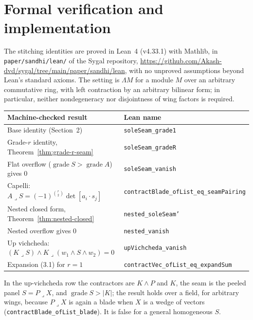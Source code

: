 \documentclass[11pt]{article}
\begin{document}
\section{Formal verification and implementation}
\label{sec:formal}

The stitching identities are proved in Lean~4 (v4.33.1) with Mathlib, in
\texttt{paper/sandhi/lean/} of the Sygal repository,
\url{https://github.com/Akash-dvd/sygal/tree/main/paper/sandhi/lean}, with no unproved
assumptions beyond Lean's standard axioms. The setting is
\(\Lambda M\) for a module \(M\) over an arbitrary commutative ring, with left
contraction by an arbitrary bilinear form; in particular, neither
nondegeneracy nor disjointness of wing factors is required.

\begin{center}
\small
\begin{tabular}{@{}ll@{}}
\toprule
Machine-checked result & Lean name\\
\midrule
Base identity (Section~2) & \texttt{soleSeam\_grade1}\\
Grade-\(r\) identity, Theorem~\ref{thm:grade-r-seam} & \texttt{soleSeam\_gradeR}\\
Flat overflow (\(\operatorname{grade}S>\operatorname{grade}A\)) gives \(0\) & \texttt{soleSeam\_vanish}\\
Capelli: \(A\mathbin{\lrcorner}S=(-1)^{\binom r2}\det[a_i\cdot s_j]\) & \texttt{contractBlade\_ofList\_eq\_seamPairing}\\
Nested closed form, Theorem~\ref{thm:nested-closed} & \texttt{nested\_soleSeam'}\\
Nested overflow gives \(0\) & \texttt{nested\_vanish}\\
Up vichcheda: \((K\mathbin{\lrcorner}S)\wedge K\mathbin{\lrcorner}(w_1\wedge S\wedge w_2)=0\) & \texttt{upVichcheda\_vanish}\\
Expansion (3.1) for \(r=1\) & \texttt{contractVec\_ofList\_eq\_expandSum}\\
\bottomrule
\end{tabular}
\end{center}

In the up-vichcheda row the contractors are \(K\wedge P\) and \(K\), the seam
is the peeled panel \(S=P\mathbin{\lrcorner}X\), and
\(\operatorname{grade}S>\lvert K\rvert\); the result holds over a field, for
arbitrary wings, because \(P\mathbin{\lrcorner}X\) is again a blade when \(X\)
is a wedge of vectors (\texttt{contractBlade\_ofList\_blade}). It is false for
a general homogeneous \(S\).
\end{document}
